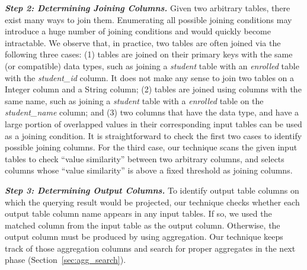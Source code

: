 \vspace{1mm}
\noindent\textit{\textbf{Step 2: Determining Joining Columns. }} Given two arbitrary tables, there exist many
ways to join them. Enumerating all possible joining conditions may introduce a huge number of joining
conditions and would quickly become intractable. We observe that, in practice, two tables are often joined via the following
three cases: (1) tables are joined on their primary keys with the same (or compatible) data types, such
as joining a \textit{student} table with an \textit{enrolled} table with the \textit{student\_id} column. It does not
make any sense to join two tables on a Integer column and a String column; (2) tables are joined
using columns with the same name, such as joining a \textit{student} table with a \textit{enrolled} table on the
\textit{student\_name} column; and (3) two columns that have the data type, and have a large portion of
overlapped values in their corresponding input tables can be used as a joining condition. It is straightforward to check the first 
two cases to identify possible joining columns. For the third case, our technique scans the given input tables to check ``value similarity''
between two arbitrary columns, and selects columns whose ``value similarity'' is above a fixed threshold as joining columns.

\vspace{1mm}
\noindent \textit{\textbf{Step 3: Determining Output Columns.}} To identify output table columns on
which the querying result would be projected, our technique checks whether each output
table column name appears in any input tables. If so, we used the matched column
from the input table as the output column. Otherwise, the output column
must be produced by using aggregation. Our technique keeps track of those aggregation columns
and search for proper aggregates in the next phase (Section~\ref{sec:agg_search}). 


